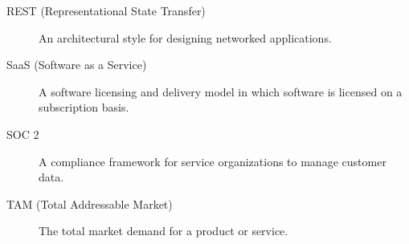 \begin{description}
    \item[REST (Representational State Transfer)] An architectural style for designing networked applications.
    
    \item[SaaS (Software as a Service)] A software licensing and delivery model in which software is licensed on a subscription basis.
    
    \item[SOC 2] A compliance framework for service organizations to manage customer data.
    
    \item[TAM (Total Addressable Market)] The total market demand for a product or service.
\end{description}
